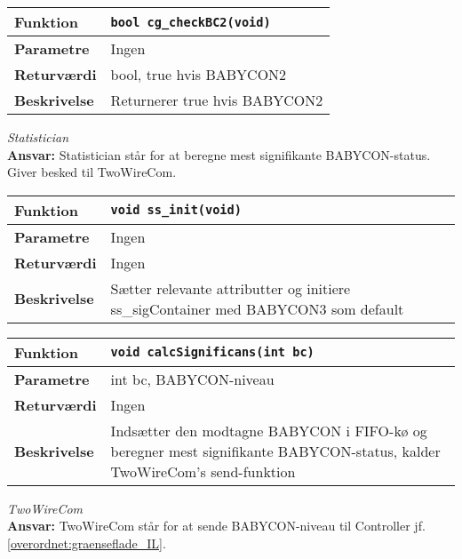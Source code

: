 \begin{center}
    \begin{tabular}{ | l | p{} |}
    \hline
    \textbf{Funktion}	& \verb+bool cg_checkBC2(void) +						\\ \hline
    \textbf{Parametre} 	& Ingen 								\\ \hline
    \textbf{Returværdi}	& bool, true hvis BABYCON2 	 								\\ \hline
    \textbf{Beskrivelse}& Returnerer true hvis BABYCON2		\\ \hline
    \end{tabular}
\end{center}



\textit{Statistician} \\
\textbf{Ansvar:} Statistician står for at beregne mest signifikante BABYCON-status. Giver besked til TwoWireCom. 

\begin{center}
    \begin{tabular}{ | l | p{} |}
    \hline
    \textbf{Funktion}	& \verb+void ss_init(void) +						\\ \hline
    \textbf{Parametre} 	& Ingen		\\ \hline
    \textbf{Returværdi}	& Ingen	 								\\ \hline
    \textbf{Beskrivelse}& Sætter relevante attributter og initiere ss\_sigContainer med BABYCON3 som default	\\ \hline
    \end{tabular}
\end{center}

\begin{center}
    \begin{tabular}{ | l | p{} |}
    \hline
    \textbf{Funktion}	& \verb+void calcSignificans(int bc) +						\\ \hline
    \textbf{Parametre} 	& int bc, BABYCON-niveau		\\ \hline
    \textbf{Returværdi}	& Ingen	 								\\ \hline
    \textbf{Beskrivelse}& Indsætter den modtagne BABYCON i FIFO-kø og beregner mest signifikante BABYCON-status, kalder TwoWireCom's send-funktion		\\ \hline
    \end{tabular}
\end{center}


\textit{TwoWireCom} \\
\textbf{Ansvar:} TwoWireCom står for at sende BABYCON-niveau til Controller jf. \ref{overordnet:graenseflade_IL}.

